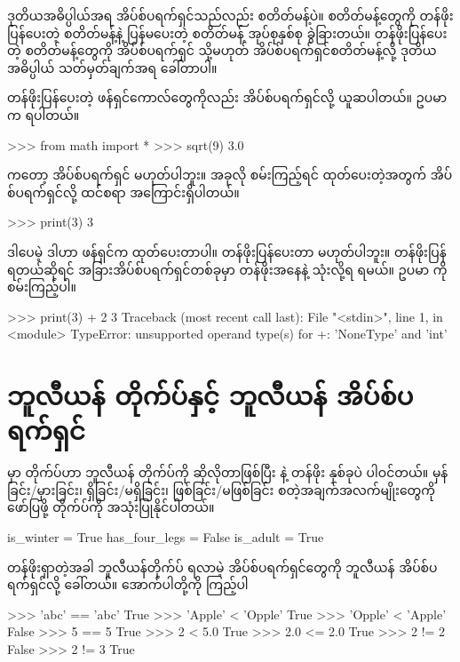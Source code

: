 ဒုတိယအဓိပ္ပါယ်အရ အိပ်စ်ပရက်ရှင်သည်လည်း စတိတ်မန့်ပဲ။ စတိတ်မန့်တွေကို တန်ဖိုးပြန်ပေးတဲ့ စတိတ်မန့်နဲ့ ပြန်မပေးတဲ့ စတိတ်မန့် အုပ်စုနှစ်စု ခွဲခြားတယ်။ တန်ဖိုးပြန်ပေးတဲ့ စတိတ်မန့်တွေကို အိပ်စ်ပရက်ရှင် သို့မဟုတ် အိပ်စ်ပရက်ရှင်စတိတ်မန့်လို့ ဒုတိယအဓိပ္ပါယ် သတ်မှတ်ချက်အရ ခေါ်တာပါ။

တန်ဖိုးပြန်ပေးတဲ့ ဖန်ရှင်ကောလ်တွေကိုလည်း အိပ်စ်ပရက်ရှင်လို့ ယူဆပါတယ်။ ဥပမာ   က  ရပါတယ်။
\begin{codetxt}
>>> from math import *
>>> sqrt(9)
3.0
\end{codetxt}
 ကတော့ အိပ်စ်ပရက်ရှင် မဟုတ်ပါဘူး။ အခုလို စမ်းကြည့်ရင်  ထုတ်ပေးတဲ့အတွက် အိပ်စ်ပရက်ရှင်လို့ ထင်စရာ အကြောင်းရှိပါတယ်။
\begin{codetxt}
>>> print(3)
3
\end{codetxt}
ဒါပေမဲ့ ဒါဟာ  ဖန်ရှင်က  ထုတ်ပေးတာပါ။ တန်ဖိုးပြန်ပေးတာ မဟုတ်ပါဘူး။ တန်ဖိုးပြန်ရတယ်ဆိုရင် အခြားအိပ်စ်ပရက်ရှင်တစ်ခုမှာ တန်ဖိုးအနေနဲ့ သုံးလို့ရ ရမယ်။ ဥပမာ  ကို စမ်းကြည့်ပါ။
\begin{codetxt}
>>> print(3) + 2
3
Traceback (most recent call last):
  File "<stdin>", line 1, in <module>
TypeError: unsupported operand type(s) for +: 'NoneType' and 'int'
\end{codetxt}




\section{ဘူလီယန် တိုက်ပ်နှင့် ဘူလီယန် အိပ်စ်ပရက်ရှင်}
 မှာ  တိုက်ပ်ဟာ ဘူလီယန်  တိုက်ပ်ကို ဆိုလိုတာဖြစ်ပြီး  နဲ့  တန်ဖိုး နှစ်ခုပဲ ပါဝင်တယ်။ မှန်ခြင်း/မှားခြင်း၊ ရှိခြင်း/မရှိခြင်း၊ ဖြစ်ခြင်း/မဖြစ်ခြင်း စတဲ့အချက်အလက်မျိုးတွေကို ဖော်ပြဖို့  တိုက်ပ်ကို  အသုံးပြုနိုင်ပါတယ်။
\begin{codetxt}
is_winter = True
has_four_legs = False
is_adult = True
\end{codetxt}

တန်ဖိုးရှာတဲ့အခါ ဘူလီယန်တိုက်ပ် ရလာမဲ့ အိပ်စ်ပရက်ရှင်တွေကို ဘူလီယန် အိပ်စ်ပရက်ရှင်လို့ ခေါ်တယ်။ အောက်ပါတို့ကို ကြည့်ပါ

\begin{codetxt}
>>> 'abc' == 'abc'
True
>>> 'Apple' < 'Opple'
True
>>> 'Opple' < 'Apple'
False
>>> 5 == 5
True
>>> 2 < 5.0
True
>>> 2.0 <= 2.0
True
>>> 2 != 2
False
>>> 2 != 3
True
\end{codetxt}

